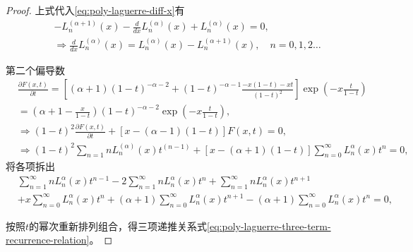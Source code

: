 \begin{subappendices}
\begin{proof}
上式代入\eqref{eq:poly-laguerre-diff-x}有
\begin{equation*}
\begin{split}
  &-L_n^{(\alpha+1)}(x) - \frac{d}{dx}L_n^{(\alpha)}(x) + L_n^{(\alpha)}(x)=0, \\
  &\Rightarrow \frac{d}{dx}L_n^{(\alpha)}(x) = L_n^{(\alpha)}(x) - L_n^{(\alpha+1)}(x), \quad n = 0,1,2\ldots
\end{split}
\end{equation*}

第二个偏导数
\begin{equation*}
\begin{split}
  &\frac{\partial F(x,t)}{\partial t} =
  \left[ (\alpha + 1) (1-t)^{-\alpha - 2} + (1-t)^{-\alpha - 1} \frac{-x(1-t)-xt}{(1-t)^2} \right] \exp \left( - x \frac{t}{1-t} \right) \\
  &=\left(\alpha + 1 - \frac{x}{1-t} \right) (1-t)^{-\alpha - 2} \exp \left( - x \frac{t}{1-t} \right), \\
  &\Rightarrow (1-t)^2 \frac{\partial F(x,t)}{\partial t} + \left[ x - (\alpha - 1)(1-t) \right] F(x,t) = 0,\\
  &\Rightarrow (1-t)^2 \sum_{n=1} n L_n^{(\alpha)} (x) t^{(n-1)} + \left[ x - (\alpha + 1) (1-t) \right] \sum_{n=0}^{\infty} L_n^{\alpha} (x) t^n = 0,
  \end{split}
\end{equation*}
将各项拆出
\begin{equation*}
  \begin{split}
    &\sum_{n=1}^{\infty} n L_{n}^{\alpha}(x) t^{n-1}
    -2 \sum_{n=1}^{\infty} n L_{n}^{\alpha}(x) t^n
    + \sum_{n=1}^{\infty} n L_{n}^{\alpha}(x) t^{n+1} \\
    &+ x \sum_{n=0}^{\infty} L_{n}^{\alpha}(x) t^n
    + (\alpha + 1) \sum_{n=0}^{\infty} L_{n}^{\alpha}(x) t^{n+1}
    -(\alpha+1) \sum_{n=0}^{\infty} L_{n}^{\alpha}(x) t^n = 0,
  \end{split}
\end{equation*}

按照$t$的幂次重新排列组合，得三项递推关系式\eqref{eq:poly-laguerre-three-term-recurrence-relation}。
\end{proof}


\end{subappendices}
